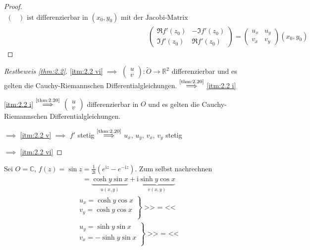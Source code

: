 \begin{theorem}[Satz]
\begin{proof}
\begin{align*}
\begin{pmatrix}
      \end{pmatrix}
      \text{ ist differenzierbar in } (x_0,y_0) \text{ mit der Jacobi-Matrix} \\
      &\phantom{\iff\quad}
      \begin{pmatrix}
        \Re f'(z_0) & -\Im f'(z_0) \\
        \Im f'(z_0) & \Re f'(z_0)
      \end{pmatrix}
      =
      \begin{pmatrix}
        u_x & u_y \\
        v_x & v_y
      \end{pmatrix}
      (x_0,y_0)
    \end{align*}
  \end{proof}
\end{theorem}

\begin{proof}[Restbeweis \ref{thm:2.2}]
  \ref{itm:2.2 vi} $\implies$ $\begin{pmatrix} u \\ v \end{pmatrix} : \widetilde{O} \to \mathbb{R}^2$ differenzierbar und es gelten die Cauchy-Riemannschen Differentialgleichungen. $\overset{\text{\ref{thm:2.20}}}{\implies}$ \ref{itm:2.2 i}
  
  \ref{itm:2.2 i} $\overset{\text{\ref{thm:2.20}}}{\implies}$ $\begin{pmatrix} u \\ v \end{pmatrix}$ differenzierbar in $O$ und es gelten die Cauchy-Riemannschen Differentialgleichungen.
  
  $\implies$ \ref{itm:2.2 v} $\implies$ $f'$ stetig $\overset{\text{\ref{thm:2.20}}}{\implies}$ $u_x$, $u_y$, $v_x$, $v_y$ stetig
  
  $\implies$ \ref{itm:2.2 vi}
\end{proof}

\begin{example}
  Sei $O = \mathbb{C}$, $f(z) = \sin z = \frac{1}{2 \mathrm{i}} \left( e^{\mathrm{i} z} - e^{-\mathrm{i} z} \right)$. Zum selbst nachrechnen
  \begin{align*}
    = \underbrace{\cosh y \sin x}_{u(x,y)} + \mathrm{i} \underbrace{\sinh y \cos x}_{v(x,y)}
  \end{align*}
  \begin{align*}
    \left.
    \begin{matrix}
      u_x = \cosh y \cos x \\
      v_y = \cosh y \cos x \\
    \end{matrix}
    \right\} \text{>> $=$ <<}
    \\
    \left.
    \begin{matrix}
      u_y = \sinh y \sin x \\
      v_x = - \sinh y \sin x \\
    \end{matrix}
    \right\} \text{>> $=$ <<}
  \end{align*}
\end{example}

